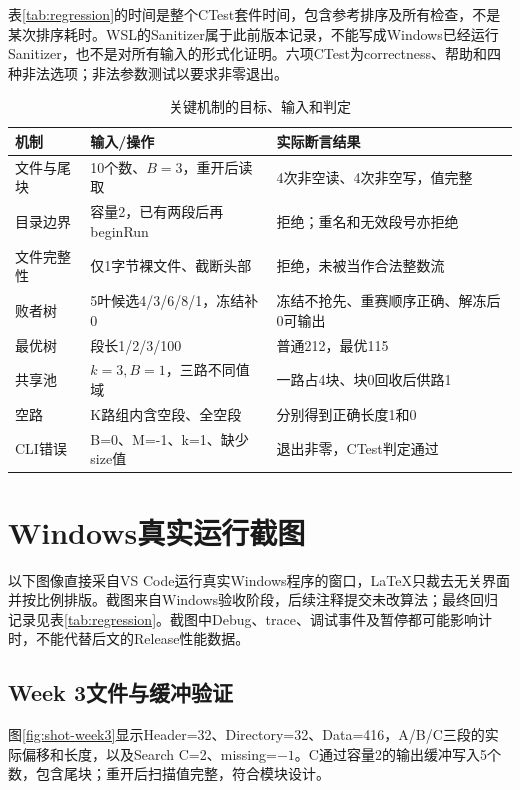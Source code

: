 表\ref{tab:regression}的时间是整个CTest套件时间，包含参考排序及所有检查，不是某次排序耗时。WSL的Sanitizer属于此前版本记录，不能写成Windows已经运行Sanitizer，也不是对所有输入的形式化证明。六项CTest为correctness、帮助和四种非法选项；非法参数测试以要求非零退出。

\begin{table}[H]\centering\caption{关键机制的目标、输入和判定}\label{tab:mechanisms}
\small\begin{tabularx}{\linewidth}{lYY}\toprule
机制 & 输入/操作 & 实际断言结果\\\midrule
文件与尾块 & 10个数、$B=3$，重开后读取 & 4次非空读、4次非空写，值完整\\
目录边界 & 容量2，已有两段后再beginRun & 拒绝；重名和无效段号亦拒绝\\
文件完整性 & 仅1字节裸文件、截断头部 & 拒绝，未被当作合法整数流\\
败者树 & 5叶候选4/3/6/8/1，冻结补0 & 冻结不抢先、重赛顺序正确、解冻后0可输出\\
最优树 & 段长1/2/3/100 & 普通212，最优115\\
共享池 & $k=3,B=1$，三路不同值域 & 一路占4块、块0回收后供路1\\
空路 & K路组内含空段、全空段 & 分别得到正确长度1和0\\
CLI错误 & B=0、M=-1、k=1、缺少size值 & 退出非零，CTest判定通过\\\bottomrule
\end{tabularx}\end{table}

\section{Windows真实运行截图}
以下图像直接采自VS Code运行真实Windows程序的窗口，LaTeX只裁去无关界面并按比例排版。截图来自Windows验收阶段，后续注释提交未改算法；最终回归记录见表\ref{tab:regression}。截图中Debug、trace、调试事件及暂停都可能影响计时，不能代替后文的Release性能数据。

\subsection{Week 3文件与缓冲验证}
图\ref{fig:shot-week3}显示Header=32、Directory=32、Data=416，A/B/C三段的实际偏移和长度，以及Search C=2、missing=$-1$。C通过容量2的输出缓冲写入5个数，包含尾块；重开后扫描值完整，符合模块设计。

